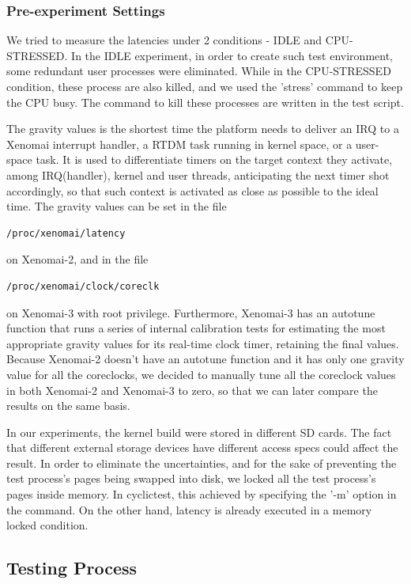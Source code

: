 \documentclass[10pt,a4paper]{article}
\begin{document}
\begin{multicols}{2}
\subsubsection{Pre-experiment Settings}
We tried to measure the latencies under 2 conditions - IDLE and CPU-STRESSED. In the IDLE experiment, in order to create such test environment, some redundant user processes were eliminated. While in the CPU-STRESSED condition, these process are also killed, and we used the 'stress' command to keep the CPU busy. The command to kill these processes are written in the test script.

  The gravity values is the shortest time the platform needs to deliver an IRQ to a Xenomai interrupt handler,  a RTDM task running in kernel space, or a user-space task. It is used to differentiate timers on the target context they activate, among IRQ(handler), kernel and user threads, anticipating the next timer shot accordingly, so that such context is activated as close as possible to the ideal time. The gravity values can be set in the file \begin{verbatim}/proc/xenomai/latency\end{verbatim} on Xenomai-2, and in the file \begin{verbatim}/proc/xenomai/clock/coreclk
\end{verbatim} on Xenomai-3 with root privilege. Furthermore, Xenomai-3 has an autotune function that runs a series of internal calibration tests for estimating the most appropriate gravity values for its real-time clock timer, retaining the final values.
Because Xenomai-2 doesn't have an autotune function and it has only one gravity value for all the 
coreclocks, we decided to manually tune all the coreclock values in both Xenomai-2 and Xenomai-3 to zero, so that we can later compare the results on the same basis. 

In our experiments, the kernel build were stored in different SD cards. The fact that different external storage devices have different access specs could affect the result. In order to eliminate the uncertainties, and for the sake of preventing the test process's pages being swapped into disk, we locked all the test process's pages inside memory. In cyclictest, this achieved by specifying the '-m' option in the command. On the other hand, latency is already executed in a memory locked condition.

\subsection{Testing Process}


\end{multicols}
\end{document}
